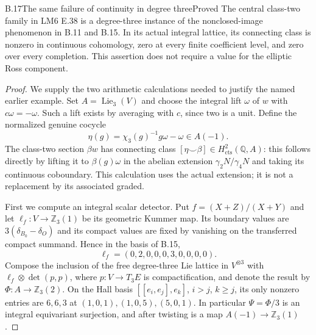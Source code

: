 \begin{statement}{B.17}{The same failure of continuity in degree three}{Proved}
The central class-two family in LM6 E.38 is a degree-three
instance of the nonclosed-image phenomenon in B.11 and B.15.
In its actual integral lattice, its connecting class is nonzero
in continuous cohomology, zero at every finite coefficient
level, and zero over every completion. This assertion does not
require a value for the elliptic Ross component.
\end{statement}
\begin{proof}
We supply the two arithmetic calculations needed to justify
the named earlier example. Set $A=\operatorname{Lie}_3(V)$ and
choose the integral lift $\omega$ of $w$ with
$c\omega=-\omega$. Such a lift exists by averaging with $c$,
since two is a unit. Define the normalized genuine cocycle
\[
 \eta(g)=\chi_3(g)^{-1}g\omega-\omega
                              \in A(-1).
                                                               \tag{B.17.1}
\]
The class-two section $\beta w$ has connecting class
$[\eta\smile\beta]\in H^2_{\mathrm{cts}}(\mathbb Q,A)$:
this follows directly by lifting it to $\beta(g)\omega$ in the
abelian extension $\gamma_2N/\gamma_4N$ and taking its
continuous coboundary. This calculation uses the actual
extension; it is not a replacement by its associated graded.

First we compute an integral scalar detector. Put
$f=(X+Z)/(X+Y)$ and let $\ell_f:V\to\mathbb Z_3(1)$ be its
geometric Kummer map. Its boundary values are
$3(\delta_{B_0}-\delta_O)$ and its compact values are fixed
by vanishing on the transferred compact summand. Hence in the
basis of B.15,
\[
              \ell_f=(0,2,0,0,0,3,0,0,0,0).
\]
Compose the inclusion of the free degree-three Lie lattice in
$V^{\otimes3}$ with $\ell_f\otimes\det(p,p)$, where
$p:V\to T_3E$ is compactification, and denote the result by
$\Phi:A\to\mathbb Z_3(2)$. On the Hall basis
$[[e_i,e_j],e_k]$, $i>j$, $k\geq j$, its only nonzero entries
are $6,6,3$ at $(1,0,1),(1,0,5),(5,0,1)$. In particular
$\Psi=\Phi/3$ is an integral equivariant surjection, and after
twisting is a map $A(-1)\to\mathbb Z_3(1)$.


\end{proof}
